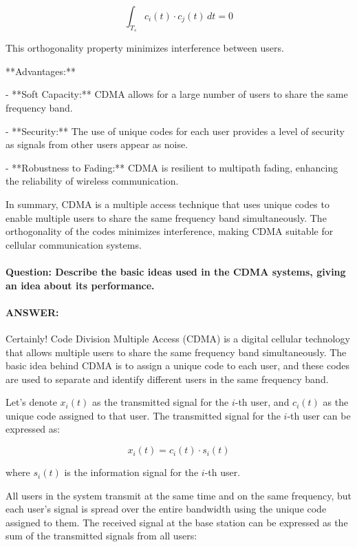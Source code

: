 \documentclass[colorlinks,11pt,a4paper,normalphoto,withhyper,ragged2e]{altareport}
\begin{document}
				\[ \int_{T_s} c_i(t) \cdot c_j(t) \, dt = 0 \]
				
				This orthogonality property minimizes interference between users.
				
				**Advantages:**
				
				- **Soft Capacity:** CDMA allows for a large number of users to share the same frequency band.
				
				- **Security:** The use of unique codes for each user provides a level of security as signals from other users appear as noise.
				
				- **Robustness to Fading:** CDMA is resilient to multipath fading, enhancing the reliability of wireless communication.
				
				In summary, CDMA is a multiple access technique that uses unique codes to enable multiple users to share the same frequency band simultaneously. The orthogonality of the codes minimizes interference, making CDMA suitable for cellular communication systems.
				
				
				
				
				
				
				
				
				
				
				\paragraph{Question: Describe the basic ideas used in the CDMA systems, giving an idea about its performance.}
				\paragraph{ANSWER:}
				
				Certainly! Code Division Multiple Access (CDMA) is a digital cellular technology that allows multiple users to share the same frequency band simultaneously. The basic idea behind CDMA is to assign a unique code to each user, and these codes are used to separate and identify different users in the same frequency band.
				
				Let's denote \(x_i(t)\) as the transmitted signal for the \(i\)-th user, and \(c_i(t)\) as the unique code assigned to that user. The transmitted signal for the \(i\)-th user can be expressed as:
				
				\[x_i(t) = c_i(t) \cdot s_i(t)\]
				
				where \(s_i(t)\) is the information signal for the \(i\)-th user.
				
				All users in the system transmit at the same time and on the same frequency, but each user's signal is spread over the entire bandwidth using the unique code assigned to them. The received signal at the base station can be expressed as the sum of the transmitted signals from all users:
				
\end{document}
